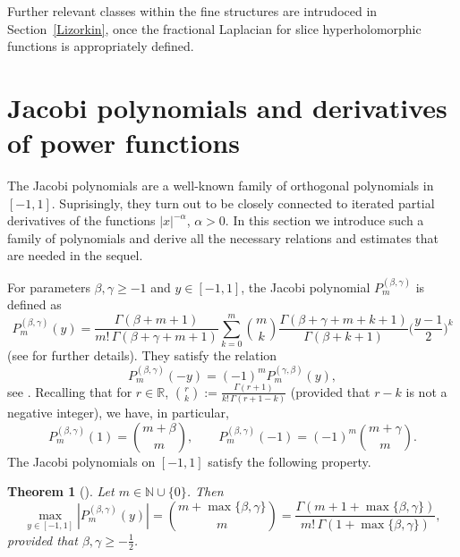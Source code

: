 \documentclass[reqno,11pt]{amsart}
\newtheorem{theorem}{Theorem}[section]
\theoremstyle{definition}
\def\R{\mathbb{R}}
\begin{document}
Further relevant classes within the fine structures are intrudoced in Section~\ref{Lizorkin}, once the fractional Laplacian for slice hyperholomorphic functions is appropriately defined.














\section{Jacobi polynomials and derivatives of power functions}\label{Jacobi}
The Jacobi polynomials are a well-known family of orthogonal polynomials in $[-1,1]$. Suprisingly, they turn out to be closely connected to iterated partial derivatives of the functions $|x|^{-\alpha}$, $\alpha>0$. In this section we introduce such a family of polynomials and derive all the necessary relations and estimates that are needed in the sequel.

For parameters $\beta, \gamma \geq -1$ and $y \in [-1,1]$, the Jacobi polynomial $P_m^{(\beta, \gamma)}$ is defined as
\begin{equation}
	\label{jacob}
	P_m^{(\beta, \gamma)}(y)= \frac{\Gamma(\beta+m+1)}{m! \, \Gamma(\beta+\gamma+m+1)} \sum_{k=0}^{m} \binom{m}{k} \frac{\Gamma(\beta+\gamma+m+k+1)}{\Gamma(\beta+k+1)} \bigg(\frac{y-1}{2}\bigg)^k
\end{equation}
(see \cite{AS,STW,S39} for further details). They satisfy the relation
\[
P_m^{(\beta, \gamma)}(-y) =(-1)^m P_m^{(\gamma,\beta)}(y),
\]
see \cite[eq. (4.1.3)]{S39}. Recalling that for $r\in \R$, $\binom{r}{k} := \frac{\Gamma(r+1)}{k!\, \Gamma(r+1-k)}$ (provided that $r-k$ is not a negative integer), we have, in particular,
\begin{equation}
	\label{EQjacobiextreme}
	P_m^{(\beta, \gamma)}(1) = \binom{m+\beta}{m},\qquad P_m^{(\beta, \gamma)}(-1) = (-1)^m\binom{m+\gamma}{m}.
\end{equation}
The Jacobi polynomials on $[-1,1]$ satisfy the following property.
\begin{theorem}[\textnormal{\cite[Thm. 7.32.1]{S39}}] Let $m\in \mathbb{N}\cup \{0\}$. Then
	\label{LEMjacobiestimate}
	\begin{equation*}
		\max_{y \in [-1,1]}|P_{m}^{(\beta, \gamma)}(y)|= \binom{m+\max\{\beta,\gamma\}}{m}=\frac{\Gamma(m+1+\max\{\beta,\gamma\})}{m!\,\Gamma(1+\max\{\beta,\gamma\})},
	\end{equation*}
	provided that $\beta,\gamma\geq -\frac{1}{2}$.
\end{theorem}
\end{document}
